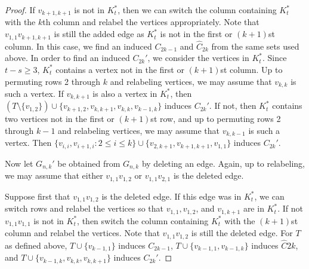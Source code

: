 \documentclass[12pt]{amsart}
\theoremstyle{plain}
\theoremstyle{definition}
\theoremstyle{remark}
\begin{document}
\begin{proof}
If $v_{k+1,k+1}$ is not in $K_t^*$, then we can switch the column containing $K_t^*$ with the $k$th column and relabel the vertices appropriately.  Note that $v_{1,1}v_{k+1,k+1}$ is still the added edge as $K_t^*$ is not in the first or $(k+1)$st column.
  In this case, we find an induced $C_{2k-1}$ and $\hat C_{2k}$ from the same sets used above.  In order to find an induced $C_{2k}'$, we consider the vertices in $K_t^*$.  Since $t - s \ge 3$, $K_t^*$ contains a vertex not in the first or $(k+1)$st column.  Up to permuting rows 2 through $k$ and relabeling vertices, we may assume that $v_{k,k}$ is such a vertex.  If $v_{k,k+1}$ is also a vertex in $K_t^*$, then $(T\setminus\{v_{1,2}\}) \cup \{v_{k+1,2}, v_{k,k+1}, v_{k,k}, v_{k-1,k}\}$ induces $C_{2k}'$.  If not, then $K_t^*$ contains two vertices not in the first or $(k+1)$st row, and up to permuting rows 2 through $k-1$ and relabeling vertices, we may assume that $v_{k,k-1}$ is such a vertex.  Then $\{v_{i,i}, v_{i+1,i}: 2\le i \le k\} \cup \{v_{2,k+1}, v_{k+1,k+1}, v_{1,1}\}$ induces $C_{2k}'$.

Now let $G_{n,k}'$ be obtained from $G_{n,k}$ by deleting an edge.  Again, up to relabeling, we may assume that either $v_{1,1}v_{1,2}$  or $v_{1,1}v_{2,1}$ is the deleted edge.

Suppose first that $v_{1,1}v_{1,2}$ is the deleted edge.  If this edge was in $K_t^*$, we can switch rows and relabel the vertices so that $v_{1,1}, v_{1,2}$, and $v_{1,k+1}$ are in $K_t^*$.  If not $v_{1,1}v_{1,1}$ is not in $K_t^*$, then switch the column containing $K_t^*$ with the $(k+1)$st column and relabel the vertices.  Note that $v_{1,1}v_{1,2}$ is still the deleted edge.  For $T$ as defined above, $T \cup \{v_{k-1,1}\}$ induces $C_{2k-1}$, $T \cup \{v_{k-1,1}, v_{k-1,k}\}$ induces $\hat C{2k}$, and $T \cup \{v_{k-1,k}, v_{k,k}, v_{k,k+1}\}$  induces $C_{2k}'$.


\end{proof}
\end{document}
